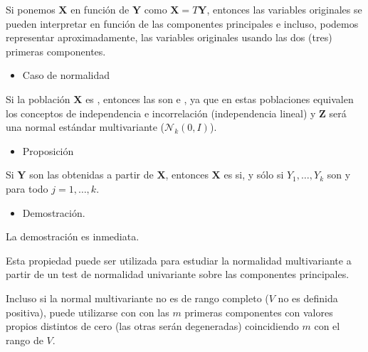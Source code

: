 Si ponemos $\mathbf{X}$ en función de $\mathbf{Y}$ como $\mathbf{X}=T\mathbf{Y}$, entonces las variables originales se pueden interpretar en función de las componentes principales e incluso, podemos representar aproximadamente, las variables originales usando las dos (tres) primeras componentes.
\begin{itemize}[label=\color{red}\textbullet, leftmargin=*]
	\item \color{lightblue}Caso de normalidad
\end{itemize}
Si la población $\mathbf{X}$ es , entonces las  son  e , ya que en estas poblaciones equivalen los conceptos de independencia e incorrelación (independencia lineal) y $\mathbf{Z}$ será una normal estándar multivariante ($\mathcal{N}_k(0,I)$).
\begin{itemize}[label=\color{red}\textbullet, leftmargin=*]
	\item \color{lightblue}Proposición
\end{itemize}
Si $\mathbf{Y}$ son las  obtenidas a partir de $\mathbf{X}$, entonces $\mathbf{X}$ es  si, y sólo si $Y_1,\dots,Y_k$ son  y  para todo $j=1,\dots,k$.
\begin{itemize}[label=\color{red}\textbullet, leftmargin=*]
	\item \color{lightblue}Demostración.
\end{itemize}
La demostración es inmediata.

Esta propiedad puede ser utilizada para estudiar la normalidad multivariante a partir de un test de normalidad univariante sobre las componentes principales.

Incluso si la normal multivariante no es de rango completo ($V$ no es definida positiva), puede utilizarse con con las $m$ primeras componentes con valores propios distintos de cero (las otras serán degeneradas) coincidiendo $m$ con el rango de $V$.

\Ej

